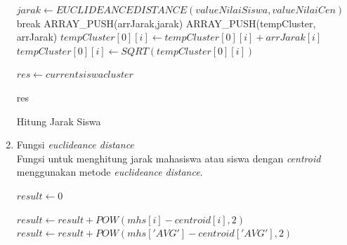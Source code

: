 \begin{enumerate}
\begin{algorithm}[H]
\begin{algorithmic}[1]
                                \State $jarak \gets EUCLIDEANCEDISTANCE(valueNilaiSiswa, valueNilaiCen)$
                                    \State break
                                \EndIf
                            \EndFor
                            \State ARRAY\_PUSH(arrJarak,jarak)
                        \EndFor
                            \State ARRAY\_PUSH(tempCluster, arrJarak)
                        \Else
                                \State $tempCluster[0][i] \gets tempCluster[0][i]+ arrJarak[i]$
                                \State $tempCluster[0][i] \gets SQRT(tempCluster[0][i])$
                            \EndFor
                        \EndIf
                    \EndFor
                    
                    \State $res \gets current siswa cluster$
                    
                    \State \Return res
                \EndProcedure
            \end{algorithmic} 
            \caption{Hitung Jarak Siswa}
            \label{alg:hitungJarakSiswa}
        \end{algorithm}
    
    \item Fungsi \textit{euclideance distance} \\
        Fungsi untuk menghitung jarak mahasiswa atau siswa dengan \textit{centroid} menggunakan metode \textit{euclideance distance}.\\
        
        \begin{algorithm}[H]
            \begin{algorithmic}[1]
                    \State $result \gets 0$
                    
                        \State $result \gets result + POW(mhs[i]-centroid[i],2)$
                    \EndFor
                    \State $result \gets result + POW(mhs['AVG']-centroid['AVG'],2)$
                    

\end{algorithmic}
\end{algorithm}
\end{enumerate}

